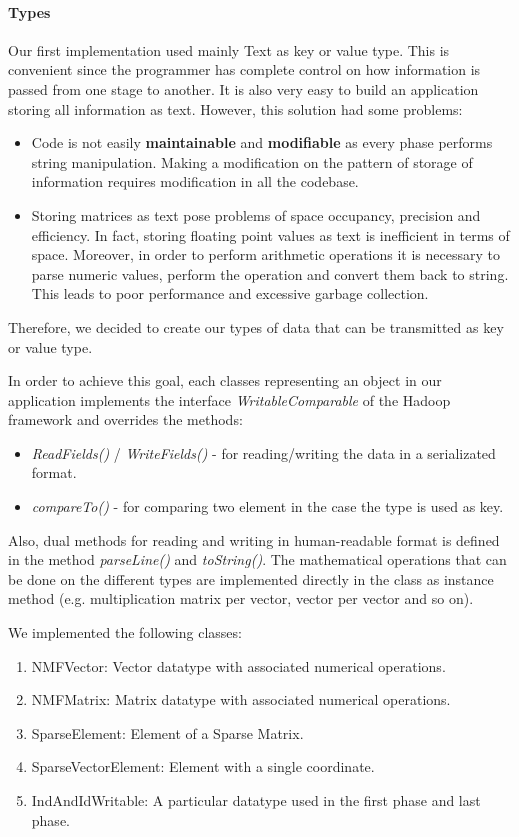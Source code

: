 \documentclass[a4paper,12pt]{article}
\newcommand{\METHOD}[1] {\textit{#1}}
\newcommand{\CLASS}[1] {\textit{#1}}
\begin{document}
\paragraph{Types}
Our first implementation used mainly Text as key or value type.
This is convenient since the programmer has complete control on how information is passed from one stage to another.
It is also very easy to build an application storing all information as text.
However, this solution had some problems:
\begin{itemize}
\item Code is not easily \textbf{maintainable} and \textbf{modifiable} as every phase performs string manipulation. 
Making a modification on the pattern of storage of information requires modification in all the codebase.
\item Storing matrices as text pose problems of space occupancy, precision and efficiency. 
In fact, storing floating point values as text is inefficient in terms of space.
Moreover, in order to perform arithmetic operations it is necessary to parse numeric values, perform the operation and convert them back to string.
This leads to poor performance and excessive garbage collection.
\end{itemize}
Therefore, we decided to create our types of data that can be transmitted as key or value type.

In order to achieve this goal, each classes representing an object in our application implements the interface \CLASS{WritableComparable} of the Hadoop framework and overrides the methods:
\begin{itemize}
  \item \METHOD{ReadFields()} / \METHOD{WriteFields()} - for reading/writing the data in a serializated format.
  \item \METHOD{compareTo()} - for comparing two element in the case the type is used as key.
\end{itemize}

Also, dual methods for reading and writing in human-readable format is defined in the method \METHOD{parseLine()} and \METHOD{toString()}.
The mathematical operations that can be done on the different types are implemented directly in the class as instance method (e.g. multiplication matrix per vector, vector per vector and so on).

We implemented the following classes:
\begin{enumerate}
  \item NMFVector: Vector datatype with associated numerical operations. 
  \item NMFMatrix: Matrix datatype with associated numerical operations.
  \item SparseElement: Element of a Sparse Matrix.
  \item SparseVectorElement: Element with a single coordinate.
  \item IndAndIdWritable: A particular datatype used in the first phase and last phase.
\end{enumerate}
\end{document}
